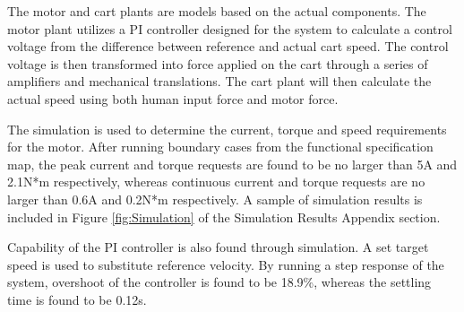 The motor and cart plants are models based on the actual components. The motor plant utilizes a PI controller designed for the system to calculate a control voltage from the difference between reference and actual cart speed. The control voltage is then transformed into force applied on the cart through a series of amplifiers and mechanical translations. The cart plant will then calculate the actual speed using both human input force and motor force.

The simulation is used to determine the current, torque and speed requirements for the motor. After running boundary cases from the functional specification map, the peak current and torque requests are found to be no larger than 5A and 2.1N*m respectively, whereas continuous current and torque requests are no larger than 0.6A and 0.2N*m respectively. A sample of simulation results is included in Figure \ref{fig:Simulation} of the Simulation Results Appendix section.

Capability of the PI controller is also found through simulation. A set target speed is used to substitute reference velocity. By running a step response of the system, overshoot of the controller is found to be 18.9\%, whereas the settling time is found to be 0.12s.